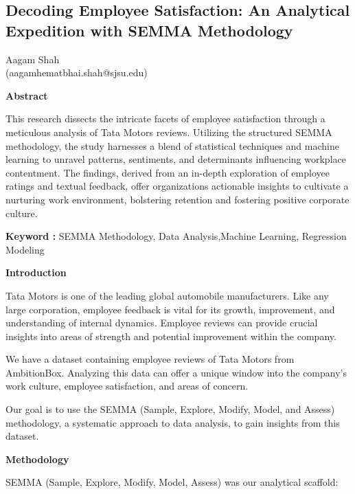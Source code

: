 \documentclass[
]{article}
\author{}
\date{}
\newcommand{\textcenter}[1]{\begin{center} \vspace{10px}\textbf{\large #1} \end{center}}
\begin{document}
\begin{center}

\section{\Large Decoding Employee Satisfaction: An Analytical Expedition with SEMMA Methodology}\label{Decoding Employee Satisfaction: An Analytical Expedition with SEMMA Methodology}

Aagam Shah\\
(aagamhematbhai.shah@sjsu.edu)

\end{center}

\textcenter{Abstract}

This research dissects the intricate facets of employee satisfaction
through a meticulous analysis of Tata Motors\textquotesingle{} reviews.
Utilizing the structured SEMMA methodology, the study harnesses a blend
of statistical techniques and machine learning to unravel patterns,
sentiments, and determinants influencing workplace contentment. The
findings, derived from an in-depth exploration of employee ratings and
textual feedback, offer organizations actionable insights to cultivate a
nurturing work environment, bolstering retention and fostering positive
corporate culture.

\begin{center}
    \textbf{Keyword :} SEMMA Methodology, Data Analysis,Machine Learning, Regression
Modeling
\end{center}


\textcenter{Introduction}

Tata Motors is one of the leading global automobile manufacturers. Like
any large corporation, employee feedback is vital for its growth,
improvement, and understanding of internal dynamics. Employee reviews
can provide crucial insights into areas of strength and potential
improvement within the company.

We have a dataset containing employee reviews of Tata Motors from
AmbitionBox. Analyzing this data can offer a unique window into the
company's work culture, employee satisfaction, and areas of concern.

Our goal is to use the SEMMA (Sample, Explore, Modify, Model, and
Assess) methodology, a systematic approach to data analysis, to gain
insights from this dataset.

\textcenter{Methodology}
SEMMA (Sample, Explore, Modify, Model, Assess) was our analytical scaffold:
\end{document}
